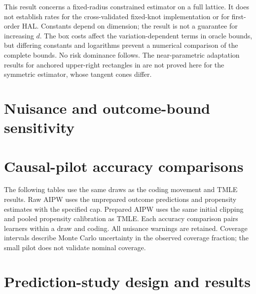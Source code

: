 \documentclass[11pt]{article}
\theoremstyle{definition}
\theoremstyle{remark}
\begin{document}
This result concerns a fixed-radius constrained estimator on a full lattice.
It does not establish rates for the cross-validated fixed-knot implementation
or for first-order HAL. Constants depend on dimension;
the result is not a guarantee for increasing $d$. The box costs affect the
variation-dependent terms in oracle bounds, but differing constants and
logarithms prevent a numerical comparison of the complete bounds. No risk
dominance follows. The near-parametric adaptation results for anchored
upper-right rectangles in \citet{fang2021} are not proved here for the
symmetric estimator, whose tangent cones differ.

\clearpage
\section{Nuisance and outcome-bound sensitivity}


\clearpage
\section{Causal-pilot accuracy comparisons}\label{sec:causal-pilot-tables}

The following tables use the same \CausalPilotDraws{} draws as the coding
movement and TMLE results. Raw AIPW uses the unprepared outcome predictions
and propensity estimates with the specified cap. Prepared AIPW uses the
same initial clipping and pooled propensity calibration as TMLE. Each
accuracy comparison pairs learners within a draw and coding. All nuisance
warnings are retained. Coverage intervals describe Monte Carlo uncertainty
in the observed coverage fraction; the small pilot does not validate
nominal coverage.





\clearpage
\section{Prediction-study design and results}\label{sec:prediction-design}
\end{document}
